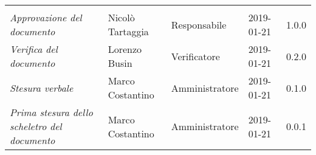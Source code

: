 \newpage 
\section*{}
\begin{table}[H]
	\centering
	\begin{tabular}{p{4cm}|C{3cm}|C{3cm}|R{2.5cm}|R{2cm}}
		
		 & & & & \\
		
		
		\emph{Approvazione del documento} & Nicolò Tartaggia & Responsabile & 2019-01-21 & 1.0.0 \\
		\hline
		
		\emph{Verifica del documento} & Lorenzo Busin & Verificatore & 2019-01-21 & 0.2.0 \\
		\hline


		\emph{Stesura verbale} & Marco Costantino & Amministratore & 2019-01-21 & 0.1.0 \\
		\hline
		
		\emph{Prima stesura dello scheletro del documento} & Marco Costantino & Amministratore & 2019-01-21 & 0.0.1 \\
		
	\end{tabular}
	
\end{table}


\clearpage